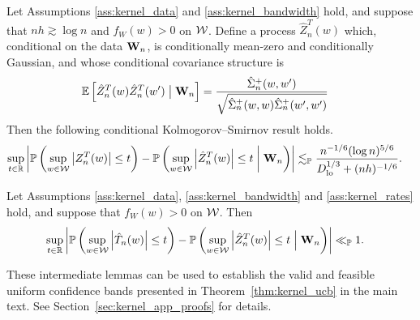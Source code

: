 \begin{lemma}
  \label{lem:kernel_app_distributional_approx_feasible_gaussian}

  Let Assumptions \ref{ass:kernel_data} and \ref{ass:kernel_bandwidth}
  hold, and suppose that
  $n h \gtrsim \log n$ and $f_W(w) > 0$ on $\mathcal{W}$.
  Define a process $\hat Z_n^T(w)$ which,
  conditional on the data $\mathbf{W}_n$,
  is conditionally mean-zero and
  conditionally Gaussian, and whose
  conditional covariance structure is
  \begin{align*}
    \mathbb{E}\left[
      \hat Z_n^T(w) \hat Z_n^T(w')
    \bigm| \mathbf{W}_n \right]
    &=
    \frac{\hat \Sigma_n^+(w,w')}
    {\sqrt{\hat \Sigma_n^+(w,w) \hat \Sigma_n^+(w',w')}}
  \end{align*}
  Then the following conditional
  Kolmogorov--Smirnov result holds.
  \begin{align*}
    \sup_{t \in \mathbb{R}}
    \left|
    \mathbb{P}\left(
      \sup_{w \in \mathcal{W}}
      \left| Z_n^T(w) \right|
      \leq t
    \right)
    - \mathbb{P}\left(
      \sup_{w \in \mathcal{W}}
      \left| \hat Z_n^T(w) \right|
      \leq t
      \biggm\vert \mathbf{W}_n
    \right)
    \right|
    &\lesssim_{\mathbb{P}}
    \frac{n^{-1/6}(\log n)^{5/6}}
    {D_{\textup{lo}}^{1/3} + (n h)^{-1/6}}.
  \end{align*}

\end{lemma}

\begin{lemma}
  \label{lem:kernel_app_feasible_gaussian_approx}

  Let Assumptions \ref{ass:kernel_data}, \ref{ass:kernel_bandwidth}
  and \ref{ass:kernel_rates} hold, and suppose that $f_W(w) > 0$ on $\mathcal{W}$.
  Then
  \begin{align*}
    \sup_{t \in \mathbb{R}}
    \left|
    \mathbb{P}\left(
      \sup_{w \in \mathcal{W}}
      \left| \hat T_n(w) \right|
      \leq t
    \right)
    - \mathbb{P}\left(
      \sup_{w \in \mathcal{W}}
      \left| \hat Z_n^T(w) \right|
      \leq t
      \Bigm\vert \mathbf{W}_n
    \right)
    \right|
    &\ll_{\mathbb{P}}
    1.
  \end{align*}

\end{lemma}

These intermediate lemmas can be used to establish the valid and feasible
uniform confidence bands presented in Theorem~\ref{thm:kernel_ucb} in the main
text. See Section~\ref{sec:kernel_app_proofs} for details.

